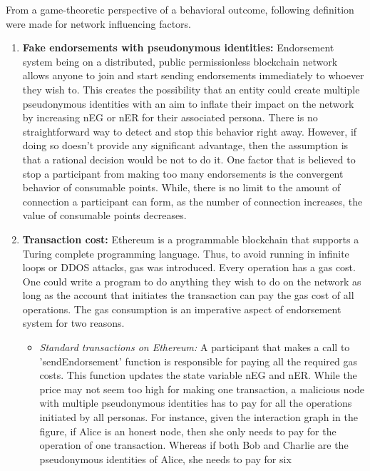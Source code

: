 From a game-theoretic perspective of a behavioral outcome, following
definition were made for network influencing factors. 

\begin{enumerate}
	\item \label{item:fakeeds} \textbf{Fake endorsements with pseudonymous
		identities:} Endorsement system being on a
		distributed, public permissionless blockchain network allows anyone to
		join and start sending endorsements immediately to whoever they wish
		to. This creates the possibility that an entity could create multiple
		pseudonymous identities with an aim to inflate their impact on the
		network by increasing nEG or nER for their associated persona.  There
		is no straightforward way to detect and stop this behavior right away.
		However, if doing so doesn't provide any significant advantage, then
		the assumption is that a rational decision would be not to do it.  One
		factor that is believed to stop a participant from making too many
		endorsements is the convergent behavior of consumable points. While,
		there is no limit to the amount of connection a participant can form,
		as the number of connection increases, the value of consumable points
		decreases. 
	\item \textbf{Transaction cost:} Ethereum is a programmable blockchain that
		supports a Turing complete programming language. Thus, to avoid running
		in infinite loops or DDOS attacks, gas was introduced. Every operation
		has a gas cost. One could write a program to do anything they wish to
		do on the network as long as the account that initiates the transaction
		can pay the gas cost of all operations. The gas consumption is an
		imperative aspect of endorsement system for two reasons. \\
		\begin{itemize}
			\item \textit{Standard transactions on Ethereum:} A participant
				that makes a call to 'sendEndorsement' function is responsible
				for paying all the required gas costs. This function updates
				the state variable nEG and nER. While the price may not seem
				too high for making one transaction, a malicious node with
				multiple pseudonymous identities has to pay for all the
				operations initiated by all personas. For instance, given the
				interaction graph in the figure, if Alice is an honest node,
				then she only needs to pay for the operation of one
				transaction. Whereas if both Bob and Charlie are the
				pseudonymous identities of Alice, she needs to pay for six

\end{itemize}
\end{enumerate}
